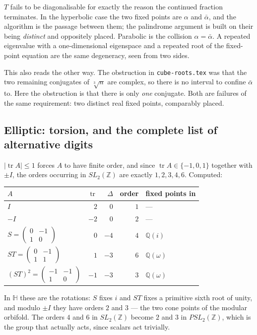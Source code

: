 \documentclass[12pt,a4paper]{article}
\theoremstyle{plain}
\theoremstyle{definition}
\newcommand{\tr}{\operatorname{tr}}
\newcommand{\Mat}[4]{\begin{pmatrix} #1 & #2 \\ #3 & #4\end{pmatrix}}
\begin{document}
\begin{tcolorbox}[colback=blue!6, colframe=blue!45!black, arc=2mm]
$T$ fails to be diagonalisable for exactly the reason the continued fraction terminates. In the hyperbolic case the two fixed points are $\alpha$ and $\bar\alpha$, and the algorithm is the passage between them; the palindrome argument is built on their being \emph{distinct} and oppositely placed. Parabolic is the collision $\alpha = \bar\alpha$. A repeated eigenvalue with a one-dimensional eigenspace and a repeated root of the fixed-point equation are the same degeneracy, seen from two sides.
\end{tcolorbox}

This also reads the other way. The obstruction in \texttt{cube-roots.tex} was that the two remaining conjugates of $\sqrt[3]{n}$ are complex, so there is no interval to confine $\bar\alpha$ to. Here the obstruction is that there is only \emph{one} conjugate. Both are failures of the same requirement: two distinct real fixed points, comparably placed.

\subsection*{Elliptic: torsion, and the complete list of alternative digits}

$|\tr A| \le 1$ forces $A$ to have finite order, and since $\tr A \in \{-1,0,1\}$ together with $\pm I$, the orders occurring in $SL_2(\mathbb{Z})$ are exactly $1,2,3,4,6$. Computed:

\begin{center}
\begin{tabular}{lrrrl}
\toprule
$A$ & $\tr$ & $\Delta$ & order & fixed points in \\
\midrule
$I$ & $2$ & $0$ & $1$ & --- \\
$-I$ & $-2$ & $0$ & $2$ & --- \\
$S = \Mat{0}{-1}{1}{0}$    & $0$  & $-4$ & $4$ & $\mathbb{Q}(i)$ \\
$ST = \Mat{0}{-1}{1}{1}$   & $1$  & $-3$ & $6$ & $\mathbb{Q}(\omega)$ \\
$(ST)^2 = \Mat{-1}{-1}{1}{0}$ & $-1$ & $-3$ & $3$ & $\mathbb{Q}(\omega)$ \\
\bottomrule
\end{tabular}
\end{center}

In $\mathbb{H}$ these are the rotations: $S$ fixes $i$ and $ST$ fixes a primitive sixth root of unity, and modulo $\pm I$ they have orders $2$ and $3$ --- the two cone points of the modular orbifold. The orders $4$ and $6$ in $SL_2(\mathbb{Z})$ become $2$ and $3$ in $PSL_2(\mathbb{Z})$, which is the group that actually acts, since scalars act trivially.
\end{document}
